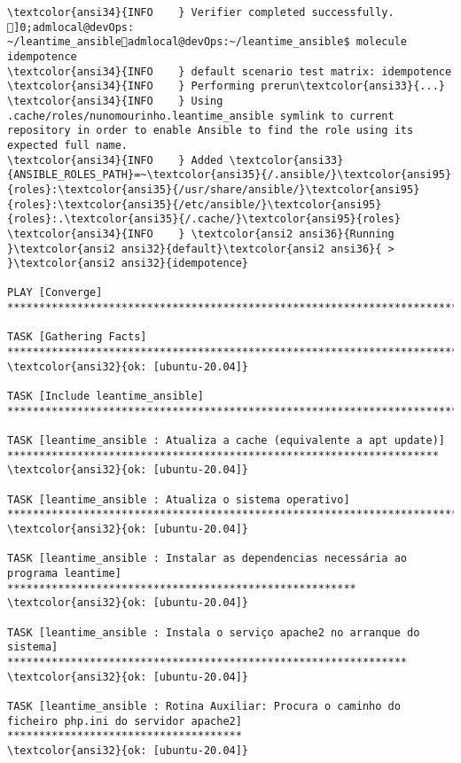 \documentclass{scrartcl}
\begin{document}
\begin{Verbatim}
\textcolor{ansi34}{INFO    } Verifier completed successfully.
]0;admlocal@devOps: ~/leantime_ansibleadmlocal@devOps:~/leantime_ansible$ molecule idempotence
\textcolor{ansi34}{INFO    } default scenario test matrix: idempotence
\textcolor{ansi34}{INFO    } Performing prerun\textcolor{ansi33}{...}
\textcolor{ansi34}{INFO    } Using .cache/roles/nunomourinho.leantime_ansible symlink to current repository in order to enable Ansible to find the role using its expected full name.
\textcolor{ansi34}{INFO    } Added \textcolor{ansi33}{ANSIBLE_ROLES_PATH}=~\textcolor{ansi35}{/.ansible/}\textcolor{ansi95}{roles}:\textcolor{ansi35}{/usr/share/ansible/}\textcolor{ansi95}{roles}:\textcolor{ansi35}{/etc/ansible/}\textcolor{ansi95}{roles}:.\textcolor{ansi35}{/.cache/}\textcolor{ansi95}{roles}
\textcolor{ansi34}{INFO    } \textcolor{ansi2 ansi36}{Running }\textcolor{ansi2 ansi32}{default}\textcolor{ansi2 ansi36}{ > }\textcolor{ansi2 ansi32}{idempotence}

PLAY [Converge] **************************************************************************************************************************

TASK [Gathering Facts] *******************************************************************************************************************
\textcolor{ansi32}{ok: [ubuntu-20.04]}

TASK [Include leantime_ansible] **********************************************************************************************************

TASK [leantime_ansible : Atualiza a cache (equivalente a apt update)] ********************************************************************
\textcolor{ansi32}{ok: [ubuntu-20.04]}

TASK [leantime_ansible : Atualiza o sistema operativo] ***********************************************************************************
\textcolor{ansi32}{ok: [ubuntu-20.04]}

TASK [leantime_ansible : Instalar as dependencias necessária ao programa leantime] *******************************************************
\textcolor{ansi32}{ok: [ubuntu-20.04]}

TASK [leantime_ansible : Instala o serviço apache2 no arranque do sistema] ***************************************************************
\textcolor{ansi32}{ok: [ubuntu-20.04]}

TASK [leantime_ansible : Rotina Auxiliar: Procura o caminho do ficheiro php.ini do servidor apache2] *************************************
\textcolor{ansi32}{ok: [ubuntu-20.04]}


\end{Verbatim}
\end{document}
